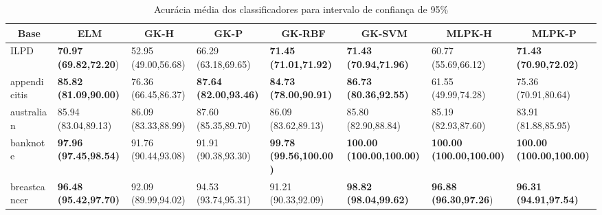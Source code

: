 \documentclass[conference]{IEEEtran}
\begin{document}
	
	\begin{table*}[thpbh]
		\caption{Acurácia média dos classificadores para intervalo de confiança de 95\%}
		\label{tab:results}
		\begin{adjustbox}{width=1\textwidth}
			
		\begin{tabular}{@{}cccccccc@{}}
			\toprule
			\textbf{Base}                               & \textbf{ELM}                             & \textbf{GK-H}                            & \textbf{GK-P}                            & \textbf{GK-RBF}                           & \textbf{GK-SVM}                             & \textbf{MLPK-H}                             & \textbf{MLPK-P}                             \\ \midrule
			\multicolumn{1}{|l|}{ILPD}         & \multicolumn{1}{l|}{\textbf{70.97 (69.82,72.20})} & \multicolumn{1}{l|}{52.95 (49.00,56.68)} & \multicolumn{1}{l|}{66.29 (63.18,69.65)} & \multicolumn{1}{l|}{\textbf{71.45 (71.01,71.92)}}  & \multicolumn{1}{l|}{\textbf{71.43 (70.94,71.96)}}    & \multicolumn{1}{l|}{60.77 (55.69,66.12)}    & \multicolumn{1}{l|}{\textbf{71.43 (70.90,72.02)}}    \\ \midrule
			\multicolumn{1}{|l|}{appendicitis} & \multicolumn{1}{l|}{\textbf{85.82 (81.09,90.00)}} & \multicolumn{1}{l|}{76.36 (66.45,86.37)} & \multicolumn{1}{l|}{\textbf{87.64 (82.00,93.46)}} & \multicolumn{1}{l|}{\textbf{84.73 (78.00,90.91)}}  & \multicolumn{1}{l|}{\textbf{86.73 (80.36,92.55)}}    & \multicolumn{1}{l|}{61.55 (49.99,74.28)}    & \multicolumn{1}{l|}{75.36 (70.91,80.64)}    \\ \midrule
			\multicolumn{1}{|l|}{australian}   & \multicolumn{1}{l|}{85.94 (83.04,89.13)} & \multicolumn{1}{l|}{86.09 (83.33,88.99)} & \multicolumn{1}{l|}{87.60 (85.35,89.70)} & \multicolumn{1}{l|}{86.09 (83.62,89.13)}  & \multicolumn{1}{l|}{85.80 (82.90,88.84)}    & \multicolumn{1}{l|}{85.19 (82.93,87.60)}    & \multicolumn{1}{l|}{83.91 (81.88,85.95)}    \\ \midrule
			\multicolumn{1}{|l|}{banknote}    & \multicolumn{1}{l|}{\textbf{97.96 (97.45,98.54)}} & \multicolumn{1}{l|}{91.76 (90.44,93.08)} & \multicolumn{1}{l|}{91.91 (90.38,93.30)} & \multicolumn{1}{l|}{\textbf{99.78 (99.56,100.00)}} & \multicolumn{1}{l|}{\textbf{100.00 (100.00,100.00)}} & \multicolumn{1}{l|}{\textbf{100.00 (100.00,100.00)}} & \multicolumn{1}{l|}{\textbf{100.00 (100.00,100.00)}} \\ \midrule
			\multicolumn{1}{|l|}{breastcancer} & \multicolumn{1}{l|}{\textbf{96.48 (95.42,97.70)}} & \multicolumn{1}{l|}{92.09 (89.99,94.02)} & \multicolumn{1}{l|}{94.53 (93.74,95.31)} & \multicolumn{1}{l|}{91.21 (90.33,92.09)}  & \multicolumn{1}{l|}{\textbf{98.82 (98.04,99.62)}}    & \multicolumn{1}{l|}{\textbf{96.88 (96.30,97.26})}    & \multicolumn{1}{l|}{\textbf{96.31 (94.91,97.54)}}    \\ \midrule

\end{tabular}
\end{adjustbox}
\end{table*}
\end{document}
